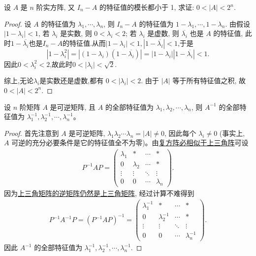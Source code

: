 \documentclass[../../main.tex]{subfiles}
\begin{document}
\begin{example}
设 \( A \) 是 \( n \) 阶实方阵, 又 \( I_n - A \) 的特征值的模长都小于 1, 求证: \( 0 < |A| < 2^n \).
\end{example}
\begin{proof}
设 \( A \) 的特征值为 \( \lambda_1, \cdots, \lambda_n \), 则 \( I_n - A \) 的特征值为 \( 1 - \lambda_1, \cdots, 1 - \lambda_n \).
由假设 \( |1 - \lambda_i| < 1 \), 若 \( \lambda_i \) 是实数, 则 \( 0 < \lambda_i < 2 \); 若 \( \lambda_i \) 是虚数, 则 \( \overline{\lambda_i} \) 也是 \( A \) 的特征值, 此时$1-\overline{\lambda_i}$也是$I_n-A$的特征值.从而$|1-\lambda_i|<1,|1-\overline{\lambda_i}|<1$,于是
\[|1-\lambda_i^2|=|(1-\lambda_i)(1-\overline{\lambda_i})|=|1-\lambda_i||1-\overline{\lambda_i}|<1.\]
因此$0<\lambda_i^2<2$,故此时$0<|\lambda_i|<\sqrt{2}$.

综上,无论$\lambda_i$是实数还是虚数,都有 \( 0 < |\lambda_i| < 2 \). 由于 \( |A| \) 等于所有特征值之积, 故 \( 0 < |A| < 2^n \).

\end{proof}

\begin{proposition}[逆矩阵的特征值]\label{proposition:逆矩阵的特征值}
设 $n$ 阶矩阵 $A$ 是可逆矩阵, 且 $A$ 的全部特征值为 $\lambda_1, \lambda_2, \cdots, \lambda_n$, 则 $A^{-1}$ 的全部特征值为 $\lambda_1^{-1}, \lambda_2^{-1}, \cdots, \lambda_n^{-1}$。
\end{proposition}
\begin{proof}
首先注意到 $A$ 是可逆矩阵, $\lambda_1 \lambda_2 \cdots \lambda_n = |A| \neq 0$, 因此每个 $\lambda_i \neq 0$ (事实上, $A$ 可逆的充分必要条件是它的特征值全不为零)。由\hyperref[theorem:复方阵必相似于上三角阵]{复方阵必相似于上三角阵}可设
\begin{align*}
P^{-1}AP = \begin{pmatrix}
\lambda_1 & * & \cdots & * \\
0 & \lambda_2 & \cdots & * \\
\vdots & \vdots & \ddots & \vdots \\
0 & 0 & \cdots & \lambda_n
\end{pmatrix}.
\end{align*}
因为\hyperref[proposition:上三角阵性质]{上三角矩阵的逆矩阵仍然是上三角矩阵}, 经过计算不难得到
\begin{align*}
P^{-1}A^{-1}P = (P^{-1}AP)^{-1} 
= \begin{pmatrix}
\lambda_1^{-1} & * & \cdots & * \\
0 & \lambda_2^{-1} & \cdots & * \\
\vdots & \vdots & \ddots & \vdots \\
0 & 0 & \cdots & \lambda_n^{-1}
\end{pmatrix}.
\end{align*}
因此 $A^{-1}$ 的全部特征值为 $\lambda_1^{-1}, \lambda_2^{-1}, \cdots, \lambda_n^{-1}$.

\end{proof}
\end{document}
